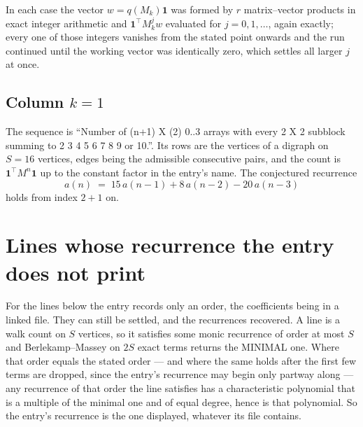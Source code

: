 \documentclass[11pt,a4paper]{article}
\theoremstyle{plain}
\theoremstyle{definition}
\begin{document}
In each case the vector $w=q(M_k)\mathbf{1}$ was formed by $r$ matrix--vector products in
exact integer arithmetic and $\mathbf{1}^{\!\top}M_k^{j}w$ evaluated for $j=0,1,\dots$,
again exactly; every one of those integers vanishes from the stated point onwards and the run
continued until the working vector was identically zero, which settles all larger $j$ at once.

\subsection*{Column $k$$=1$}
The sequence is ``Number of (n+1) X (2) 0..3 arrays with every 2 X 2 subblock summing to 2 3 4 5 6 7 8 9 or 10.''. Its rows are the vertices of a digraph on
$S=16$ vertices, edges being the admissible consecutive pairs, and the count is
$\mathbf{1}^{\!\top}M^{n}\mathbf{1}$ up to the constant factor in the entry's name.
The conjectured recurrence
\[
a(n)\;=\;15\,a(n-1) + 8\,a(n-2) - 20\,a(n-3)
\]
holds from index $2+1$ on.


\section{Lines whose recurrence the entry does not print}

For the lines below the entry records only an order, the coefficients being in a linked file.
They can still be settled, and the recurrences recovered. A line is a walk count on $S$
vertices, so it satisfies some monic recurrence of order at most $S$ and Berlekamp--Massey on
$2S$ exact terms returns the MINIMAL one. Where that order equals the stated order --- and
where the same holds after the first few terms are dropped, since the entry's recurrence may
begin only partway along --- any recurrence of that order the line satisfies has a
characteristic polynomial that is a multiple of the minimal one and of equal degree, hence is
that polynomial. So the entry's recurrence is the one displayed, whatever its file contains.
\end{document}
